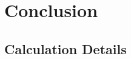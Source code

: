 \documentclass[12pt]{report}
\begin{document}
\chapter{Conclusion}\label{conclusion}


\begin{appendices}

\chapter{Calculation Details} \label{calc_details}



\end{appendices}


\newpage




\end{document}

